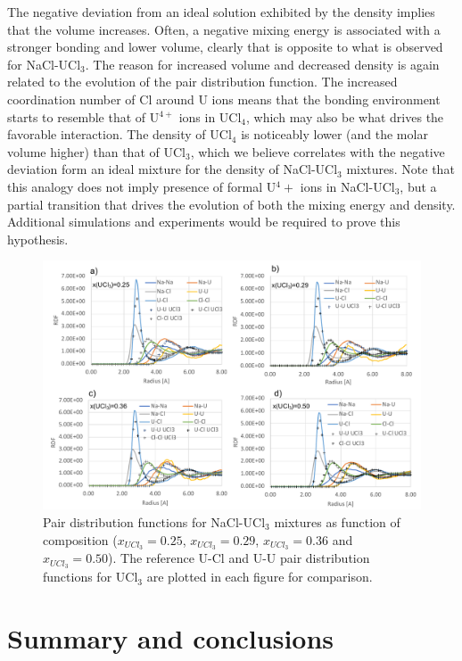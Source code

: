 \documentclass[titlepage=firstiscover,11pt,fleqn,headheight=14pt,footheight=40.8pt]{scrreprt}
\begin{document}
The negative deviation from an ideal solution exhibited by the density implies that the volume increases. Often, a negative mixing energy is associated with a stronger bonding and lower volume, clearly that is opposite to what is observed for NaCl-UCl$_3$. The reason for increased volume and decreased density is again related to the evolution of the pair distribution function. The increased coordination number of Cl around U ions means that the bonding environment starts to resemble that of U$^{4+}$ ions in UCl$_4$, which may also be what drives the favorable interaction. The density of UCl$_4$ is noticeably lower (and the molar volume higher) than that of UCl$_3$, which we believe correlates with the negative deviation form an ideal mixture for the density of NaCl-UCl$_3$ mixtures. Note that this analogy does not imply  presence of formal U$^4+$ ions in NaCl-UCl$_3$, but a partial transition that drives the evolution of both the mixing energy and density. Additional simulations and experiments would be required to prove this hypothesis.

 \begin{figure}[htb]
\centering
\includegraphics[width=1.00\textwidth]{FIG77.pdf}
\caption{Pair distribution functions for NaCl-UCl$_3$ mixtures as function of composition ($x_{UCl_3}=0.25$, $x_{UCl_3}=0.29$, $x_{UCl_3}=0.36$ and $x_{UCl_3}=0.50$). The reference U-Cl and U-U pair distribution functions for UCl$_3$ are plotted in each figure for comparison.} 
\label{fig:fig_pair}
\end{figure}

\chapter{Summary and conclusions}

         

\end{document}
